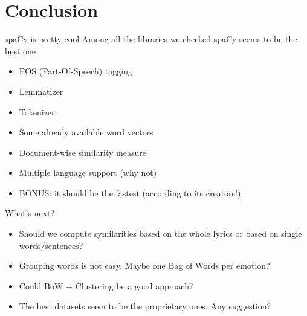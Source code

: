 \documentclass[xcolor=dvipsnames]{beamer}
\begin{document}
\section{Conclusion}

\begin{frame}{spaCy is pretty cool}
Among all the libraries we checked spaCy seems to be the best one
\begin{itemize}
\item POS (Part-Of-Speech) tagging
\item Lemmatizer
\item Tokenizer
\item Some already available word vectors
\item Document-wise similarity measure
\item Multiple language support (why not)
\item BONUS: it should be the fastest (according to its creators!)
\end{itemize}
\end{frame}

\begin{frame}{What's next?}
\begin{itemize}
\item Should we compute symilarities based on the whole lyrics or based on single words/sentences?
\item Grouping words is not easy. Maybe one Bag of Words per emotion?
\item Could BoW + Clustering be a good approach?
\item The best datasets seem to be the proprietary ones. Any suggestion?
\end{itemize}
\end{frame}

\end{document}
